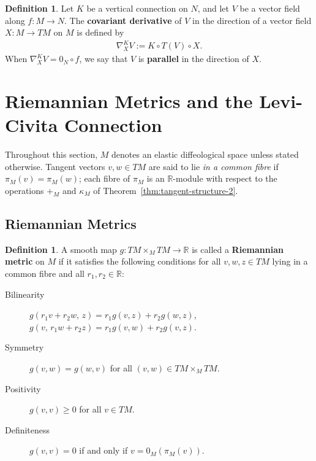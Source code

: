 \documentclass{amsart}
\newcommand{\R}{\mathbb{R}}
\theoremstyle{definition}
\newtheorem{defn}[thm]{Definition}
\begin{document}
\begin{defn}\label{def:covariant-derivative-along}
Let $K$ be a vertical connection on $N$, and let $V$ be a vector field
along $f \colon M \to N$.
The \textbf{covariant derivative} of $V$ in the direction of a vector field
$X \colon M \to TM$ on $M$ is defined by
\begin{align*}
    \nabla^K_X V := K \circ T(V) \circ X.
\end{align*}
When $\nabla^K_X V = 0_N \circ f$, we say that $V$ is \textbf{parallel}
in the direction of $X$.
\end{defn}

\section{Riemannian Metrics and the Levi-Civita Connection}\label{sec:riemannian-metric}

Throughout this section, $M$ denotes an elastic diffeological space unless
stated otherwise. Tangent vectors $v, w \in TM$ are said to lie \emph{in a
common fibre} if $\pi_M(v) = \pi_M(w)$; each fibre of $\pi_M$ is an
$\R$-module with respect to the operations $+_M$ and $\kappa_M$ of
Theorem~\ref{thm:tangent-structure-2}.

\subsection{Riemannian Metrics}\label{subsec:metric}

\begin{defn}\label{def:metric}
A smooth map $g \colon TM \times_M TM \to \R$ is called a
\textbf{Riemannian metric} on $M$ if it satisfies the following conditions
for all $v, w, z \in TM$ lying in a common fibre and all
$r_1, r_2 \in \R$:
 \begin{description}
     \item[Bilinearity]
   $g(r_1v + r_2w,\, z) = r_1g(v, z) + r_2g(w, z)$,\quad
   $g(v,\, r_1w + r_2z) = r_1g(v, w) + r_2g(v, z)$.
 \item[Symmetry]
   $g(v, w) = g(w, v)$ for all $(v, w) \in TM \times_M TM$.
 \item[Positivity]
   $g(v, v) \geq 0$ for all $v \in TM$.
 \item[Definiteness]
   $g(v, v) = 0$ if and only if $v = 0_M(\pi_M(v))$.
 \end{description}
\end{defn}
\end{document}
